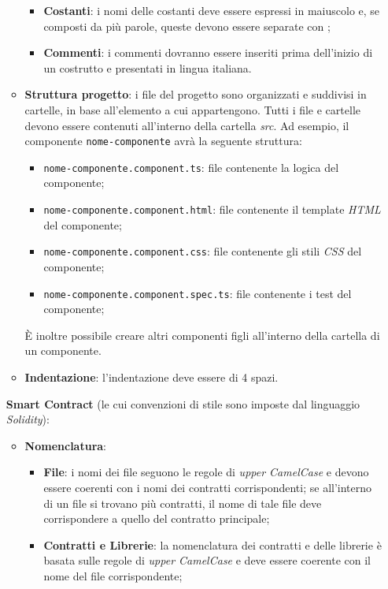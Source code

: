 \begin{itemize}
\begin{itemize}
\begin{itemize}
            \item \textbf{Costanti}: i nomi delle costanti deve essere espressi in maiuscolo e, se composti da più parole, queste devono essere separate con \textit{\textunderscore};
            \item \textbf{Commenti}: i commenti dovranno essere inseriti prima dell’inizio di un  costrutto e presentati in
            lingua italiana.
        \end{itemize}
        \item \textbf{Struttura progetto}: i file del progetto sono organizzati e suddivisi in cartelle, in base all'elemento a cui appartengono.
        Tutti i file e cartelle devono essere contenuti all'interno della cartella \textit{src}.
        Ad esempio, il componente \texttt{nome-componente} avrà la seguente struttura:
        \begin{itemize}
            \item \texttt{nome-componente.component.ts}: file contenente la logica del componente;
            \item \texttt{nome-componente.component.html}: file contenente il template \textit{HTML} del componente;
            \item \texttt{nome-componente.component.css}: file contenente gli stili \textit{CSS} del componente;
            \item \texttt{nome-componente.component.spec.ts}: file contenente i test del componente;
        \end{itemize}
        È inoltre possibile creare altri componenti figli all'interno della cartella di un componente.
        \item \textbf{Indentazione}: l'indentazione deve essere di 4 spazi.
    \end{itemize}
    \textbf{Smart Contract} (le cui convenzioni di stile sono imposte dal linguaggio \textit{Solidity}):
    \begin{itemize}
        \item \textbf{Nomenclatura}:
        \begin{itemize}
            \item \textbf{File}: i nomi dei file seguono le regole di \textit{upper CamelCase} e devono essere coerenti con i nomi dei contratti corrispondenti; se all'interno di un file si trovano più contratti, il nome di tale file deve corrispondere a quello del contratto principale;
            \item \textbf{Contratti e Librerie}: la nomenclatura dei contratti e delle librerie è basata sulle regole di \textit{upper CamelCase} e deve essere coerente con il nome del file corrispondente;

\end{itemize}
\end{itemize}
\end{itemize}
